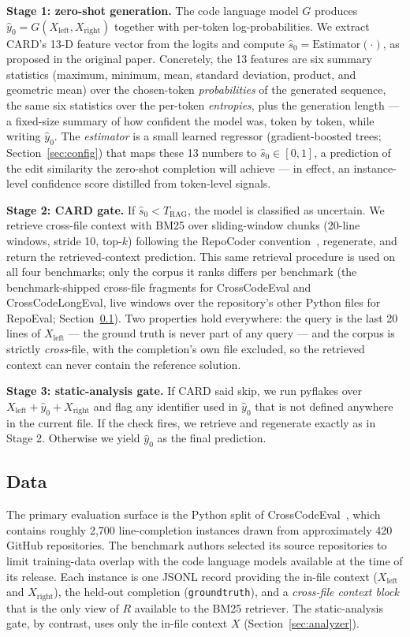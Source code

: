 \documentclass[10pt,conference]{IEEEtran}
\newcommand{\new}[1]{{\color{blue}#1}}
\newcommand{\ugr}[1]{{\color{revgreen}#1}}
\begin{document}
\textbf{Stage 1: zero-shot generation.} The code language model $G$
produces $\hat{y}_0 = G(X_{\text{left}}, X_{\text{right}})$ together
with per-token log-probabilities. We extract CARD's 13-D feature vector
from the logits and compute $\hat{s}_0 = \text{Estimator}(\cdot)$, as proposed in the original paper.
\ugr{Concretely, the 13 features are six summary statistics (maximum, minimum,
mean, standard deviation, product, and geometric mean) over the chosen-token
\emph{probabilities} of the generated sequence, the same six statistics over the
per-token \emph{entropies}, plus the generation length --- a fixed-size summary
of how confident the model was, token by token, while writing $\hat{y}_0$. The
\emph{estimator} is a small learned regressor (gradient-boosted trees;
Section~\ref{sec:config}) that maps these 13 numbers to $\hat{s}_0 \in
[0,1]$, a prediction of the edit similarity the zero-shot completion will
achieve --- in effect, an instance-level confidence score distilled from
token-level signals.}

\textbf{Stage 2: CARD gate.} If $\hat{s}_0 < T_{\text{RAG}}$, the model
is classified as uncertain. We retrieve cross-file context with BM25 over
sliding-window chunks (20-line windows, stride 10, top-$k$) following
the RepoCoder convention~\cite{zhang2023repocoder}, regenerate, and
return the retrieved-context prediction.
\ugr{This same retrieval procedure is used on all four benchmarks; only the
corpus it ranks differs per benchmark (the benchmark-shipped cross-file
fragments for CrossCodeEval and CrossCodeLongEval, live windows over the
repository's other Python files for RepoEval; Section~\ref{sec:data}). Two
properties hold everywhere: the query is the last 20 lines of
$X_{\text{left}}$ --- the ground truth is never part of any query --- and the
corpus is strictly \emph{cross}-file, with the completion's own file excluded,
so the retrieved context can never contain the reference solution.}

\textbf{Stage 3: static-analysis gate.} If CARD said skip, we
\new{run pyflakes over $X_{\text{left}}+\hat{y}_0+X_{\text{right}}$ and flag any
identifier used in $\hat{y}_0$ that is not defined anywhere in the current file. If the check fires}, we retrieve and regenerate
exactly as in Stage 2. Otherwise we yield $\hat{y}_0$ as the final prediction.

\subsection{Data}
\label{sec:data}
The primary evaluation surface is the Python split of CrossCodeEval~\cite{ding2023cce}, which contains roughly
2{,}700 line-completion instances drawn from approximately 420 GitHub
repositories. The benchmark authors selected its source repositories
to limit training-data overlap with the code language models
available at the time of its release. Each instance is one JSONL
record providing the in-file context ($X_{\text{left}}$ and $X_{\text{right}}$),
the held-out completion (\texttt{groundtruth})\ugr{,}
and a \emph{cross-file context block} that is the only view of $R$
available to the BM25 retriever\new{. The static-analysis gate, by contrast, uses
only the in-file context $X$ (Section~\ref{sec:analyzer})}.
\end{document}
